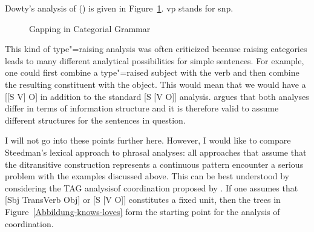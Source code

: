 \begin{exe}
\begin{xlist}[iv.]
\begin{exe}
\begin{xlist}[iv.]
\noindent
Dowty's analysis of () is given in Figure~\ref{Abb-CG-Gapping}. vp stands for s\bs np.
\begin{figure}
\caption{\label{Abb-CG-Gapping}Gapping in Categorial Grammar}
\end{figure}%

This kind of type"=raising analysis was often criticized because raising categories leads to many different analytical possibilities
for simple sentences. For example, one could first combine a type"=raised subject with the verb and then combine the resulting constituent
with the object. This would mean that we would have a [[S V]
O] in addition to the standard [S [V O]] analysis.
\citet{Steedman91a} argues that both analyses differ in terms of information structure and it is therefore valid to assume different structures
for the sentences in question.

I will not go into these points further here. However, I would like to compare Steedman's lexical approach to phrasal analyses: all approaches
that assume that the ditransitive construction represents a continuous pattern encounter a serious problem with the examples discussed above. This
can be best understood by considering the TAG analysis\indextag of coordination proposed by \citet{SJ96a}.
If one assumes that [Sbj TransVerb Obj] or [S [V O]] constitutes a fixed unit, then the trees in
Figure~\vref{Abbildung-knows-loves} form the starting point for the analysis of coordination. 


\end{xlist}
\end{exe}
\end{xlist}
\end{exe}
